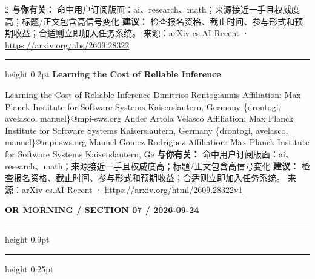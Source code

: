\documentclass[10.5pt]{ctexart}
\begin{document}
\begin{multicols}{2}
\textbf{与你有关：} 命中用户订阅版面：ai、research、math；来源接近一手且权威度高；标题/正文包含高信号变化
\textbf{建议：} 检查报名资格、截止时间、参与形式和预期收益；合适则立即加入任务系统。
{\footnotesize\color{ormuted} 来源：arXiv cs.AI Recent · \url{https://arxiv.org/abs/2609.28322}}
\vspace{2mm}
\hrule height 0.2pt
\vspace{2mm}
{\large\bfseries Learning the Cost of Reliable Inference}\par
Learning the Cost of Reliable Inference Dimitrios Rontogiannis Affiliation: Max Planck Institute for Software Systems Kaiserslautern, Germany \{drontogi, avelasco, manuel\}@mpi-sws.org Ander Artola Velasco Affiliation: Max Planck Institute for Software Systems Kaiserslautern, Germany \{drontogi, avelasco, manuel\}@mpi-sws.org Manuel Gomez Rodriguez Affiliation: Max Planck Institute for Software Systems Kaiserslautern, Ge
\textbf{与你有关：} 命中用户订阅版面：ai、research、math；来源接近一手且权威度高；标题/正文包含高信号变化
\textbf{建议：} 检查报名资格、截止时间、参与形式和预期收益；合适则立即加入任务系统。
{\footnotesize\color{ormuted} 来源：arXiv cs.AI Recent · \url{https://arxiv.org/html/2609.28322v1}}
\end{multicols}
\newpage
{\small\bfseries OR MORNING / SECTION 07 / 2026-09-24}
\vspace{2mm}
\hrule height 0.9pt
\vspace{1.5mm}
\hrule height 0.25pt
\vspace{4mm}
\end{document}
